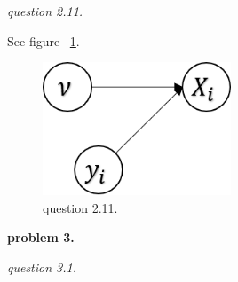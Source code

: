 \documentclass{article}
\begin{document}
\vspace{\baselineskip}
\textit{question 2.11.}

See figure ~\ref{fig:2-11}.

\begin{figure}[H]
    \centering
        \includegraphics[width=0.5\textwidth]{2-11}
    \caption{question 2.11.}
    \label{fig:2-11}
\end{figure}


\vspace{\baselineskip}
\textbf{problem 3.}

\vspace{\baselineskip}
\textit{question 3.1.}
\end{document}
